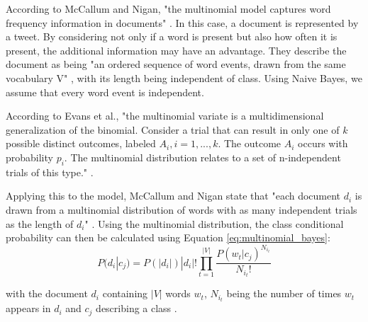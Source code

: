         According to McCallum and Nigan, "the multinomial model captures word frequency information in documents" \cite[p.~3]{Mccallum1998}. In this case, a document is represented by a tweet. By considering not only if a word is present but also how often it is present, the additional information may have an advantage. They describe the document as being "an ordered sequence of word events, drawn from the same vocabulary V" \cite[p.~3]{Mccallum1998}, with its length being independent of class. Using Naive Bayes, we assume that every word event is independent.
        
        
        According to Evans et al., "the multinomial variate is a multidimensional generalization of the binomial. Consider a trial that can result in only one of $k$ possible distinct outcomes, labeled $A_i, i = 1,...,k$. The outcome $A_i$ occurs with probability $p_i$. The multinomial distribution relates to a set of n-independent trials of this type." \cite[p.~135]{evans2011statistical}.
        
        Applying this to the model, McCallum and Nigan state that "each document $d_i$ is drawn from a multinomial distribution of words with as many independent trials as the length of $d_i$" \cite[p.~3]{Mccallum1998}. Using the multinomial distribution, the class conditional probability can then be calculated using Equation \eqref{eq:multinomial_bayes}:
        \begin{equation}
            \label{eq:multinomial_bayes}
                P(d_i|c_j) = P(|d_i|)|d_i|!\prod_{t=1}^{|V|}\frac{P(w_t|c_j)^{N_{i_t}}}{N_{i_t}!}
        \end{equation}
        
        with the document $d_i$ containing $|V|$ words $w_t$, $N_{i_t}$ being the number of times $w_t$ appears in $d_i$ and $c_j$ describing a class \cite{Mccallum1998}. 
        
